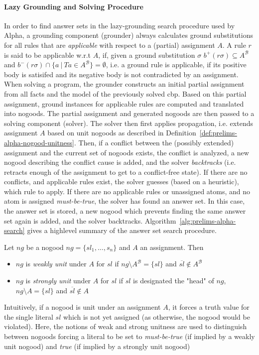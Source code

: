 \paragraph{Lazy Grounding and Solving Procedure~\cite{alpha-techniques}}
In order to find answer sets in the lazy-grounding search procedure used by Alpha, a grounding component (grounder) always calculates ground substitutions for all rules that are \emph{applicable} with respect to a (partial) assignment $A$. A rule $r$ is said to be applicable w.r.t $A$, if, given a ground substitution $\sigma$ $b^{+}(r\sigma) \subseteq A^{\mathcal{B}}$ and $b^{-}(r\sigma) \cap \{a~|~Ta \in A^{\mathcal{B}}\} = \emptyset$, i.e. a ground rule is applicable, if its positive body is satisifed and its negative body is not contradicted by an assignment.
When solving a program, the grounder constructs an initial partial assignment from all facts and the model of the previously solved \gls{cbp}. Based on this partial assignment, ground instances for applicable rules are computed and translated into nogoods. The partial assignment and generated nogoods are then passed to a solving component (solver). The solver then first applies propagation, i.e. extends assignment $A$ based on unit nogoods as described in Definition~\ref{def:prelims-alpha-nogood-unitness}. Then, if a conflict between the (possibly extended) assignment and the current set of nogoods exists, the conflict is analyzed, a new nogood describing the conflict cause is added, and the solver \emph{backtracks} (i.e. retracts enough of the assignment to get to a conflict-free state). If there are no conflicts, and applicable rules exist, the solver guesses (based on a heuristic), which rule to apply. If there are no applicable rules or unassigned atoms, and no atom is assigned \emph{must-be-true}, the solver has found an answer set. In this case, the answer set is stored, a new nogood which prevents finding the same answer set again is added, and the solver backtracks. Algorithm~\ref{alg:prelims-alpha-search} gives a highlevel summary of the answer set search procedure.

\begin{definition}
\label{def:prelims-alpha-nogood-unitness}	
Let $ng$ be a nogood $ng = \{sl_1,\ldots,s_n\}$ and $A$ an assignment. Then
\begin{itemize}
	\item $ng$ is \emph{weakly unit} under $A$ for $sl$ if $ng \setminus A^{\mathcal{B}} = \{sl\}$ and $\overline{sl} \notin A^{\mathcal{B}}$
	\item $ng$ is \emph{strongly unit} under $A$ for $sl$ if $sl$ is designated the "head" of $ng$, $ng \setminus A = \{sl\}$ and $\overline{sl} \notin A$
\end{itemize}	
Intuitively, if a nogood is unit under an assignment $A$, it forces a truth value for the single literal $sl$ which is not yet assigned (as otherwise, the nogood would be violated). Here, the notions of weak and strong unitness are used to distinguish between nogoods forcing a literal to be set to \emph{must-be-true} (if implied by a weakly unit nogood) and \emph{true} (if implied by a strongly unit nogood)
\end{definition}	

